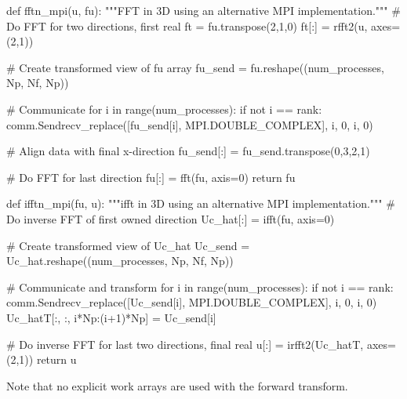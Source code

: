 \documentclass[11pt, oneside]{article}
\begin{document}
\begin{python}
def fftn_mpi(u, fu):
    """FFT in 3D using an alternative MPI implementation."""
    # Do FFT for two directions, first real
    ft = fu.transpose(2,1,0)
    ft[:] = rfft2(u, axes=(2,1))

    # Create transformed view of fu array
    fu_send = fu.reshape((num_processes, Np, Nf, Np))

    # Communicate
    for i in range(num_processes):
        if not i == rank:
            comm.Sendrecv_replace([fu_send[i], MPI.DOUBLE_COMPLEX], i, 0, i, 0)

    # Align data with final x-direction
    fu_send[:] = fu_send.transpose(0,3,2,1)

    # Do FFT for last direction
    fu[:] = fft(fu, axis=0)
    return fu

def ifftn_mpi(fu, u):
    """ifft in 3D using an alternative MPI implementation."""
    # Do inverse FFT of first owned direction
    Uc_hat[:] = ifft(fu, axis=0)

    # Create transformed view of Uc_hat
    Uc_send = Uc_hat.reshape((num_processes, Np, Nf, Np))

    # Communicate and transform
    for i in range(num_processes):
       if not i == rank:
           comm.Sendrecv_replace([Uc_send[i],
                                 MPI.DOUBLE_COMPLEX], i, 0, i, 0)
       Uc_hatT[:, :, i*Np:(i+1)*Np] = Uc_send[i]

    # Do inverse FFT for last two directions, final real
    u[:] = irfft2(Uc_hatT, axes=(2,1))
    return u
\end{python}
Note that no explicit work arrays are used with the forward transform.


\end{document}
